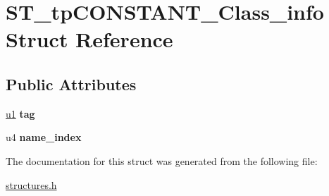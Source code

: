 \hypertarget{structST__tpCONSTANT__Class__info}{}\section{S\+T\+\_\+tp\+C\+O\+N\+S\+T\+A\+N\+T\+\_\+\+Class\+\_\+info Struct Reference}
\label{structST__tpCONSTANT__Class__info}
\subsection*{Public Attributes}
\begin{DoxyCompactItemize}
\item 
\mbox{\label{structST__tpCONSTANT__Class__info_ac73d433e59eeab359a067394e2235e5f}} 
\mbox{\hyperlink{structures_8h_ad9f4cdb6757615aae2fad89dab3c5470}{u1}} {\bfseries tag}
\item 
\mbox{\label{structST__tpCONSTANT__Class__info_acb9ac7d0148b5ee691495bd8370adfc6}} 
u4 {\bfseries name\+\_\+index}
\end{DoxyCompactItemize}


The documentation for this struct was generated from the following file\+:\begin{DoxyCompactItemize}
\item 
\mbox{\hyperlink{structures_8h}{structures.\+h}}\end{DoxyCompactItemize}
